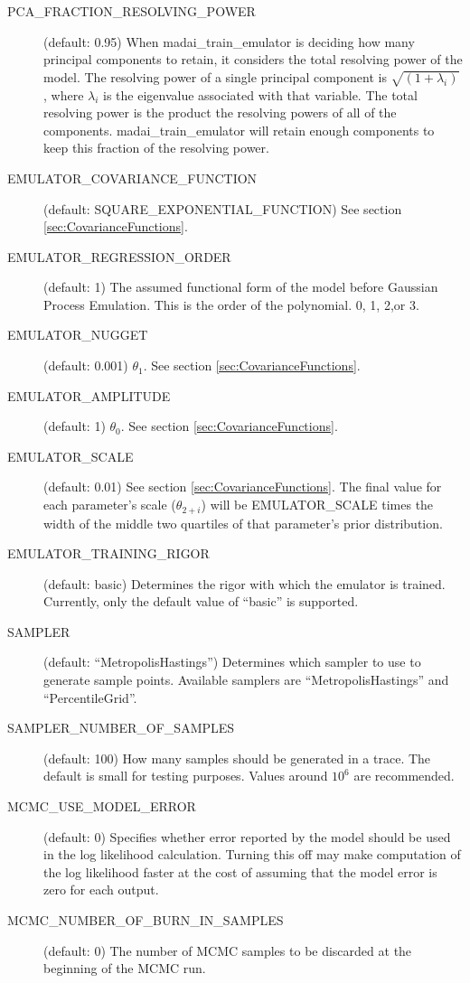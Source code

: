 \begin{description}
    \item[PCA\_FRACTION\_RESOLVING\_POWER] (default: 0.95)  When madai\_train\_emulator is deciding how many principal components to retain, it considers the total resolving power of the model. The resolving power of a single principal component is $\sqrt{(1 + \lambda_i)}$, where $\lambda_i$ is the eigenvalue associated with that variable. The total resolving power is the product the resolving powers of all of the components. madai\_train\_emulator will retain enough components to keep this fraction of the resolving power.
    \item[EMULATOR\_COVARIANCE\_FUNCTION] (default: SQUARE\_EXPONENTIAL\_FUNCTION) See section \ref{sec:CovarianceFunctions}.
    \item[EMULATOR\_REGRESSION\_ORDER] (default: 1) The assumed functional form of the model before Gaussian Process Emulation. This is the order of the polynomial. 0, 1, 2,or 3.
    \item[EMULATOR\_NUGGET] (default: 0.001) $\theta_1$. See section \ref{sec:CovarianceFunctions}.
    \item[EMULATOR\_AMPLITUDE] (default: 1) $\theta_0$. See section \ref{sec:CovarianceFunctions}.
    \item[EMULATOR\_SCALE] (default: 0.01) See section \ref{sec:CovarianceFunctions}. The final value for each parameter's scale ($\theta_{2+i}$) will be EMULATOR\_SCALE times the width of the middle two quartiles of that parameter's prior distribution.
    \item[EMULATOR\_TRAINING\_RIGOR] (default: basic) Determines the rigor with which the emulator is trained. Currently, only the default value of ``basic'' is supported.
    \item[SAMPLER] (default: ``MetropolisHastings'') Determines which sampler to use to generate sample points. Available samplers are ``MetropolisHastings'' and ``PercentileGrid''.
    \item[SAMPLER\_NUMBER\_OF\_SAMPLES] (default: 100) How many samples should be generated in a trace. The default is small for testing purposes. Values around $10^6$ are recommended.
    \item[MCMC\_USE\_MODEL\_ERROR] (default: 0) Specifies whether error reported by the model should be used in the log likelihood calculation. Turning this off may make computation of the log likelihood faster at the cost of assuming that the model error is zero for each output.
    \item[MCMC\_NUMBER\_OF\_BURN\_IN\_SAMPLES] (default: 0) The number of MCMC samples to be discarded at the beginning of the MCMC run.

\end{description}
